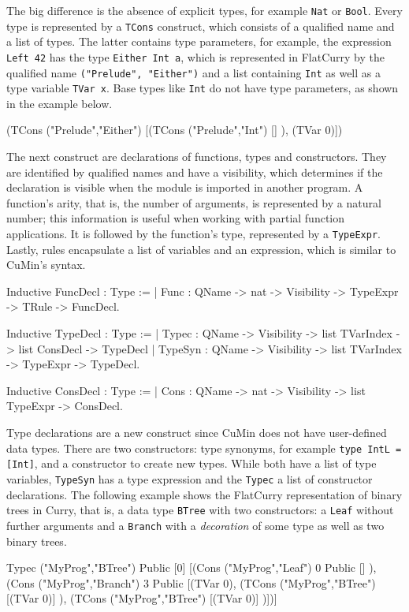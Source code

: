 \documentclass[paper = a4, fleqn, abstract=on, twoside]{scrreprt}
\newcommand{\coqinline}[1]{\texttt{#1}}
\begin{document}
The big difference is the absence of explicit types, for example \texttt{Nat} or \texttt{Bool}.  Every type is represented by a \coqinline{TCons} construct, which consists of a qualified name and a list of types. The latter contains type parameters, for example, the expression \texttt{Left 42} has the type \texttt{Either Int a}, which is represented in FlatCurry by the qualified name \texttt{("Prelude", "Either")} and a list containing \texttt{Int} as well as a type variable \texttt{TVar x}. Base types like \texttt{Int} do not have type parameters, as shown in the example below.
\begin{coqcode}
(TCons ("Prelude","Either") [(TCons ("Prelude","Int") [] ), (TVar 0)])
\end{coqcode}
The next construct are declarations of functions, types and constructors. They are identified by qualified names and have a visibility, which determines if the declaration is visible when the module is imported in another program. A function's arity, that is, the number of arguments, is represented by a natural number; this information is useful when working with partial function applications. It is followed by the function's type, represented by a \coqinline{TypeExpr}. Lastly, rules encapsulate a list of variables and an expression, which is similar to CuMin's syntax.
\begin{coqcode}
Inductive FuncDecl : Type := 
  | Func : QName -> nat -> Visibility -> TypeExpr -> TRule -> FuncDecl.

Inductive TypeDecl : Type :=
  | Typec   : QName -> Visibility -> list TVarIndex -> list ConsDecl -> TypeDecl
  | TypeSyn : QName -> Visibility -> list TVarIndex -> TypeExpr      -> TypeDecl.
  
Inductive ConsDecl : Type :=
  | Cons :  QName -> nat -> Visibility -> list TypeExpr -> ConsDecl.
\end{coqcode}
Type declarations are a new construct since CuMin does not have user-defined data types. There are two constructors: type synonyms, for example \texttt{type IntL = [Int]}, and a constructor to create new types. While both have a list of type variables, \texttt{TypeSyn} has a type expression and the \texttt{Typec} a list of constructor declarations. The following example shows the FlatCurry representation of binary trees in Curry, that is, a data type \texttt{BTree} with two constructors: a \texttt{Leaf} without further arguments and a \texttt{Branch} with a \textit{decoration} of some type as well as two binary trees.
\begin{coqcode}
Typec ("MyProg","BTree") Public  [0]  
  [(Cons ("MyProg","Leaf") 0 Public  [] ),
   (Cons ("MyProg","Branch") 3 Public
     [(TVar 0), 
      (TCons ("MyProg","BTree") [(TVar 0)] ), 
      (TCons ("MyProg","BTree") [(TVar 0)] )])]
\end{coqcode}
\end{document}
